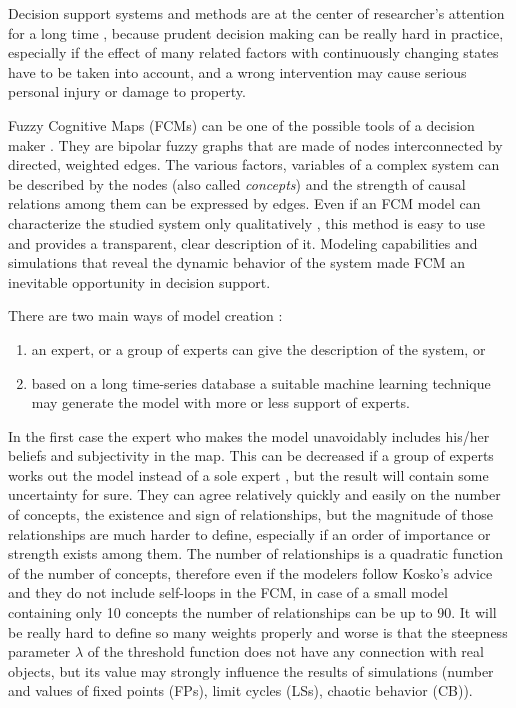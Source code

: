 \documentclass[graybox]{svmult}
\begin{document}
Decision support systems and methods are at the center of 
researcher's attention for a long time \cite{busemeyer1999dynamic}, 
because prudent decision making can be really hard in practice, 
especially if the effect of many related factors with continuously 
changing states have to be taken into account, and a wrong 
intervention may cause serious personal injury or damage to property.

Fuzzy Cognitive Maps (FCMs) \cite{b.kosko1986} can be one of the 
possible tools of a decision maker \cite{papageorgiou2013fuzzy}. 
They are bipolar fuzzy graphs that are made of nodes interconnected 
by directed, weighted edges. The various factors, variables of a 
complex system can be described by the nodes (also called \emph
{concepts}) and the strength of causal relations among them can be 
expressed by edges. Even if an FCM model can characterize the 
studied system only qualitatively \cite{j.l.salmeron2009}, this 
method is easy to use and provides a transparent, clear description 
of it. Modeling capabilities and simulations that reveal the dynamic 
behavior of the system made FCM an inevitable opportunity in 
decision support.

There are two main ways of model creation \cite{papageorgiou2012learning}:
\begin{enumerate}
  \item an expert, or a group of experts can give the description of 
  the system, or
  \item based on a long time-series database a suitable machine 
  learning technique may generate the model with more or less support 
  of experts.
\end{enumerate}

In the first case the expert who makes the model unavoidably 
includes his/her beliefs and subjectivity in the map. This can be 
decreased if a group of experts works out the model instead of a 
sole expert \cite{kosko1988hidden,groumpos2010fuzzy}, but the result 
will contain some uncertainty for sure. They can agree relatively 
quickly and easily on the number of concepts, the existence and sign 
of relationships, but the magnitude of those relationships are much 
harder to define, especially if an order of importance or strength 
exists among them. The number of relationships is a quadratic 
function of the number of concepts, therefore even if the modelers 
follow Kosko's advice and they do not include self-loops in the FCM, 
in case of a small model containing only 10 concepts the number of 
relationships can be up to 90. It will be really hard to define so 
many weights properly and worse is that the steepness parameter 
$\lambda$ of the threshold function does not have any connection 
with real objects, but its value may strongly influence the results 
of simulations (number and values of fixed points (FPs), limit cycles 
(LSs), chaotic behavior (CB)).
\end{document}
